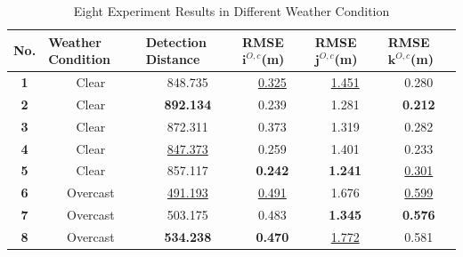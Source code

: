 \begin{table}[!th]
	\centering
	\caption{Eight Experiment Results in Different Weather Condition}
	\label{lab:eight_ground_landing}
	\begin{tabular}{cccccc}
		\hline
		\multicolumn{1}{l}{\textbf{No.}} & \multicolumn{1}{l}{\textbf{Weather Condition}} & \multicolumn{1}{l}{\textbf{Detection Distance}} & \multicolumn{1}{l}{\textbf{RMSE $\mathbf{i}^{O,c}$(m)}} & \multicolumn{1}{l}{\textbf{RMSE $\mathbf{j}^{O,c}$(m)}} & \multicolumn{1}{l}{\textbf{RMSE $\mathbf{k}^{O,c}$(m)}} \\ \hline
		\textbf{1} & Clear & 848.735 & \underline{0.325} & \underline{1.451} & 0.280 \\
		\textbf{2} & Clear & \textbf{892.134} & 0.239 & 1.281 & \textbf{0.212} \\
		\textbf{3} & Clear & 872.311 & 0.373 & 1.319 & 0.282 \\
		\textbf{4} & Clear & \underline{847.373} & 0.259 & 1.401 & 0.233 \\
		\textbf{5} & Clear & 857.117 & \textbf{0.242} & \textbf{1.241} & \underline{0.301} \\ \hline
		\textbf{6} & Overcast & \underline{491.193} & \underline{0.491} & 1.676 & \underline{0.599} \\
		\textbf{7} & Overcast & 503.175 & 0.483 & \textbf{1.345} & \textbf{0.576} \\
		\textbf{8} & Overcast & \textbf{534.238} & \textbf{0.470} & \underline{1.772} & 0.581 \\ \hline
	\end{tabular}
\end{table}




